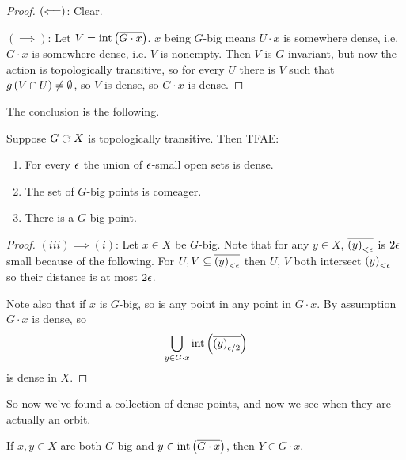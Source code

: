 \documentclass{amsart}
\begin{document}
\begin{proof}
$\left(\Longleftarrow\right)$: Clear. 

$\left(\implies\right)$: Let $V = \operatorname{int}\left(\overline{G\cdot x}\right)$. $x$ being
$G$-big means $U\cdot x$ is somewhere dense, i.e. $G\cdot x$ is somewhere dense, i.e. $V$
is nonempty. 
Then $V$ is $G$-invariant, but now the action is topologically transitive, so for every
$U$ there is $V$ such that $g\left(V\cap U\right)\neq \emptyset$, so $V$ is dense, so $G\cdot
x$ is dense.
\end{proof}

The conclusion is the following. 

\begin{lem}
Suppose $G\acts X$ is topologically transitive. Then
TFAE:
\begin{enumerate}[label = (\iii)]
\item For every $\epsilon$ the union of $\epsilon$-small open sets is dense.
\item The set of $G$-big points is comeager.
\item There is a $G$-big point.
\end{enumerate}
\end{lem}

\begin{proof}
$\left(iii\right)\implies \left(i\right)$: Let $x\in X$ be $G$-big.
Note that for any $y\in X$, $\overline{\left(y\right)_{<\epsilon}}$
is $2\epsilon$ small because of the following. 
For $U,V\subseteq \overline{\left(y\right)_{<\epsilon}}$ then $U$, $V$ both intersect
$\left(y\right)_{<\epsilon}$ so their distance is at most $2\epsilon$. 

Note also that if $x$ is $G$-big, so is any point in any point in $G\cdot x$. 
By assumption $G\cdot x$ is dense, so 
\begin{equation}
\bigcup_{y\in G\cdot x} \operatorname{int}\left(\overline{\left(y\right)_{\epsilon / 2}}\right)
\end{equation}
is dense in $X$.
\end{proof}

So now we've found a collection of dense points, and now we see when they are actually an
orbit.

\begin{lem}
If $x,y\in X$ are both $G$-big and $y\in \operatorname{int}\left(\overline{G\cdot x}\right)$, then $Y\in G\cdot
x$.
\end{lem}
\end{document}
